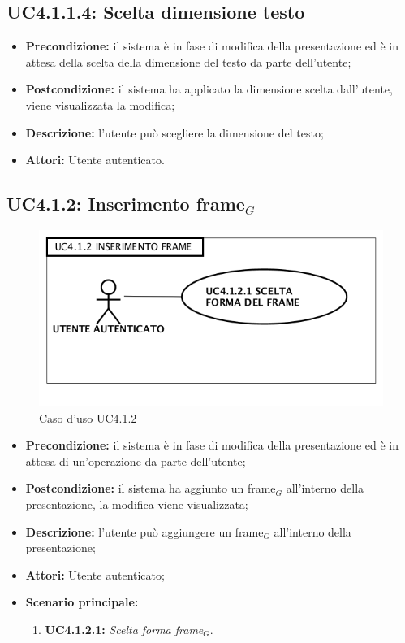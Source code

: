 \subsection{ UC4.1.1.4: Scelta dimensione testo}

\begin{itemize}
	\item \textbf{Precondizione:} il sistema è in fase di modifica della presentazione ed è in attesa della scelta della dimensione del testo da parte dell'utente;
	\item \textbf{Postcondizione:} il sistema ha applicato la dimensione scelta dall'utente, viene visualizzata la modifica;
	\item \textbf{Descrizione:} l'utente può scegliere la dimensione del testo;
	\item \textbf{Attori:} Utente autenticato.
\end{itemize}
\subsection{ UC4.1.2: Inserimento frame$_G$}

\begin{figure}[H]
	\begin{center}
	\includegraphics[scale=0.4]{diagram/UC4-1-2.png}
	\caption{Caso d'uso UC4.1.2}
	\end{center}
\end{figure}
\begin{itemize}
	\item \textbf{Precondizione:} il sistema è in fase di modifica della presentazione ed è in attesa di un'operazione da parte dell'utente;
	\item \textbf{Postcondizione:} il sistema ha aggiunto un frame$_G$ all'interno della presentazione, la modifica viene visualizzata;
	\item \textbf{Descrizione:} l'utente può aggiungere un frame$_G$ all'interno della presentazione;
	\item \textbf{Attori:} Utente autenticato;
	\item \textbf{Scenario principale:}
	\begin{enumerate}
		\item \textbf{ UC4.1.2.1:} \textit{ Scelta forma frame$_G$}.
	\end{enumerate}
\end{itemize}
